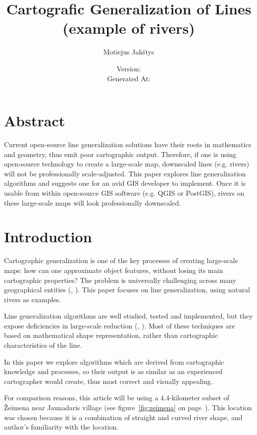 \documentclass{article}
\title{
    Cartografic Generalization of Lines \\
    (example of rivers) \\ \vspace{4mm}
}
\author{Motiejus Jakštys}
\date{
    \vspace{10mm}
    Version: \VCDescribe \\ \vspace{4mm}
    Generated At: \GeneratedAt
}
\begin{document}
\maketitle

\newpage

\section{Abstract}
\label{sec:abstract}

Current open-source line generalization solutions have their roots in
mathematics and geometry, thus emit poor cartographic output. Therefore, if one
is using open-source technology to create a large-scale map, downscaled lines
(e.g. rivers) will not be professionally scale-adjusted. This paper explores
line generalization algorithms and suggests one for an avid GIS developer to
implement. Once it is usable from within open-source GIS software (e.g. QGIS or
PostGIS), rivers on these large-scale maps will look professionally downscaled.

\section{Introduction}
\label{sec:introduction}

Cartographic generalization is one of the key processes of creating large-scale
maps: how can one approximate object features, without losing its main
cartographic properties? The problem is universally challenging across many
geographical entities (\cite{muller1991generalization},
\cite{mcmaster1992generalization}). This paper focuses on line generalization,
using natural rivers as examples.

Line generalization algorithms are well studied, tested and implemented, but
they expose deficiencies in large-scale reduction (\cite{monmonier1986toward},
\cite{mcmaster1993spatial}). Most of these techniques are based on mathematical
shape representation, rather than cartographic characteristics of the line.

In this paper we explore algorithms which are derived from cartographic
knowledge and processes, so their output is as similar as an experienced
cartographer would create, thus most correct and visually appealing.

For comparison reasons, this article will be using a 4.4-kilometer subset of
Žeimena near Jaunadaris village (see figure~\ref{fig:zeimena} on
page~\pageref{fig:zeimena}). This location was chosen because it is a combination
of straight and curved river shape, and author's familiarity with the location.
\end{document}
